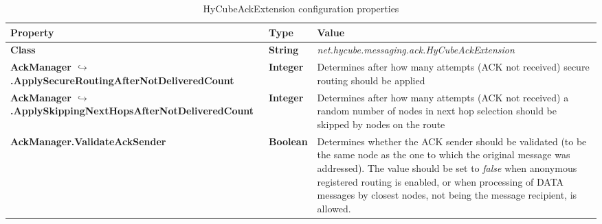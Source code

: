 \begin{table}
\scriptsize
\begin{center}
\begin{tabular}{p{6.5cm} p{1.0cm} p{7.0cm}}
	\hline
	\textbf{Property}							& \textbf{Type}					& \textbf{Value}					\\[1mm]
    \hline
	\textbf{Class}								& \textbf{String}				& \textit{net.hycube.messaging.ack.HyCubeAckExtension}								\\[1.5mm]	
	\textbf{AckManager \newline $\hookrightarrow$.ApplySecureRoutingAfterNotDeliveredCount}			& \textbf{Integer}			& Determines after how many attempts (ACK not received) secure routing should be applied			\\[1.5mm]	
	\textbf{AckManager \newline $\hookrightarrow$.ApplySkippingNextHopsAfterNotDeliveredCount}		& \textbf{Integer}			& Determines after how many attempts (ACK not received) a random number of nodes in next hop selection should be skipped by nodes on the route			\\[1.5mm]	
	\textbf{AckManager.ValidateAckSender}							& \textbf{Boolean}				& Determines whether the ACK sender should be validated (to be the same node as the one to which the original message was addressed). The value should be set to \emph{false} when anonymous registered routing is enabled, or when processing of DATA messages by closest nodes, not being the message recipient, is allowed.			\\[1.5mm]	
    \hline
\end{tabular}
\end{center}
\caption{HyCubeAckExtension configuration properties}
\label{tab:libHyCubeAckExtension}
\end{table}

